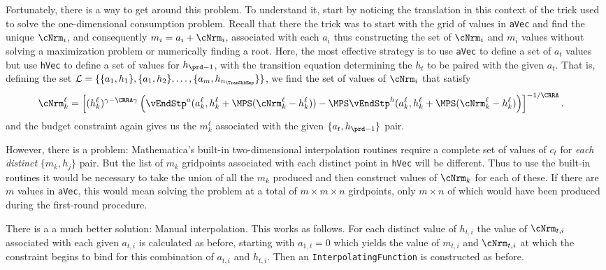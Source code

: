 \documentclass[\econtexRoot/SolvingMicroDSOPs]{subfiles}
\begin{document}
Fortunately, there is a way to get around this problem.  To
understand it, start by noticing the translation in this context of
the trick used to solve the one-dimensional consumption problem.
Recall that there the trick was to start with the grid of values in
\texttt{aVec} and find the unique ${\cNrm}_{i}$, and
consequently $m_{i}={a}_{i}+{\cNrm}_{i}$, associated with
each $a_{i}$ thus constructing the set of ${\cNrm}_{i}$ and
$m_{i}$ values without solving a maximization problem or
numerically finding a root.  Here, the most effective strategy is to
use \texttt{aVec} to define a set of $a_{t}$ values but use
\texttt{hVec} to define a set of values for $h_{\prd-1}$, with the
transition equation determining the $h_{t}$ to be paired with the
given $a_{t}$.  That is, defining the set $\mathcal{L} =
\{\{{a}_{1},h_{1}\},\{{a}_{1},h_{2}\},\ldots,\{{a}_{m},h_{n_{\TranShkEmp}}\}\}$,
we find the set of values of ${\cNrm}_{i}$ that satisfy
\begin{equation}\begin{gathered}\begin{aligned}
  {\cNrm}_{k}^{\ell}  & = \left[(h_{k}^{\ell})^{\gamma-\CRRA\gamma}
                        \left(\vEndStp^{a}(a_{k}^{\ell},h_{k}^{\ell}
                        +\MPS({\cNrm}_{k}^{\ell}-h_{k}^{\ell}))
                        -\MPS
                        \vEndStp^{h}(a_{k}^{\ell},h_{k}^{\ell}+\MPS({\cNrm}_{k}^{\ell}-h_{k}^{\ell})\right)
                        \right]^{-1/\CRRA}. \nonumber
\end{aligned}\end{gathered}\end{equation}
and the budget constraint again gives us the $m_{k}^{\ell}$
associated with the given $\{{a}_{t},h_{\prd-1}\}$ pair.

However, there is a problem: {Mathematica}'s built-in two-dimensional
interpolation routines require a complete set of values of $c_{t}$
for \textit{each distinct} $\{{m}_{k},h_{j}\}$ pair.  But the list of
$m_{k}$ gridpoints associated with each distinct point in
\texttt{hVec} will be different.  Thus to use the built-in routines
it would be necessary to take the union of all the $m_{k}$
produced and then construct values of ${\cNrm}_{k}$ for each of
these.  If there are $m$ values in \texttt{aVec}, this would
mean solving the problem at a total of $m \times m \times n$
girdpoints, only $m \times n$ of which would have been produced
during the first-round procedure.

There is a a much better solution: Manual interpolation.  This works
as follows.  For each distinct value of $h_{t,i}$ the value of
${\cNrm}_{t,i}$ associated with each given $a_{t,i}$ is
calculated as before, starting with $a_{1,t}=0$ which yields
the value of $m_{t,i}$ and ${\cNrm}_{t,i}$ at which the
constraint begins to bind for this combination of $a_{t,i}$
and $h_{t,i}$.  Then an \texttt{InterpolatingFunction} is
constructed as before.
\end{document}
